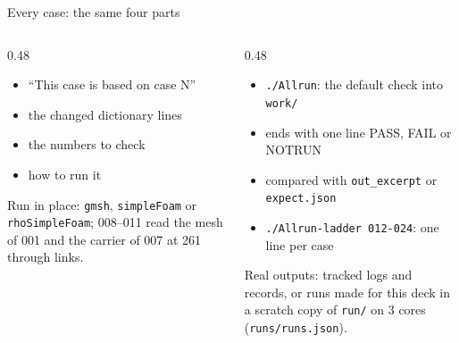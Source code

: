 \documentclass[aspectratio=169,10pt]{beamer}
\begin{document}
\begin{frame}[t]{Every case: the same four parts}
  \begin{columns}[T,onlytextwidth]
    \begin{column}{0.48\textwidth}
      \begin{itemize}
        \item ``This case is based on case N''
        \item the changed dictionary lines
        \item the numbers to check
        \item how to run it
      \end{itemize}
      \vspace{0.4em}
      {\small Run in place: \texttt{gmsh}, \texttt{simpleFoam} or \texttt{rhoSimpleFoam}; 008--011 read the mesh of 001 and the carrier of 007 at 261 through links.\par}
    \end{column}
    \begin{column}{0.48\textwidth}
      \begin{itemize}
        \item \texttt{./Allrun}: the default check into \texttt{work/}
        \item ends with one line PASS, FAIL or NOTRUN
        \item compared with \texttt{out\_excerpt} or \texttt{expect.json}
        \item \texttt{./Allrun-ladder 012-024}: one line per case
      \end{itemize}
      \vspace{0.4em}
      {\small Real outputs: tracked logs and records, or runs made for this deck in a scratch copy of \texttt{run/} on 3 cores (\texttt{runs/runs.json}).\par}
    \end{column}
  \end{columns}
\end{frame}
\end{document}
